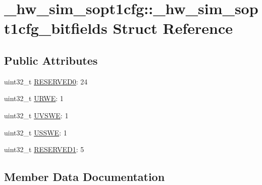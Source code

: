 \hypertarget{struct__hw__sim__sopt1cfg_1_1__hw__sim__sopt1cfg__bitfields}{}\section{\+\_\+hw\+\_\+sim\+\_\+sopt1cfg\+:\+:\+\_\+hw\+\_\+sim\+\_\+sopt1cfg\+\_\+bitfields Struct Reference}
\label{struct__hw__sim__sopt1cfg_1_1__hw__sim__sopt1cfg__bitfields}
\subsection*{Public Attributes}
\begin{DoxyCompactItemize}
\item 
uint32\+\_\+t \hyperlink{struct__hw__sim__sopt1cfg_1_1__hw__sim__sopt1cfg__bitfields_a7fa37a3c3d473222b979f8968fac1c8e}{R\+E\+S\+E\+R\+V\+E\+D0}\+: 24
\item 
uint32\+\_\+t \hyperlink{struct__hw__sim__sopt1cfg_1_1__hw__sim__sopt1cfg__bitfields_a08b38931caa98e2036bba49cdbcb4f19}{U\+R\+WE}\+: 1
\item 
uint32\+\_\+t \hyperlink{struct__hw__sim__sopt1cfg_1_1__hw__sim__sopt1cfg__bitfields_a62e6be5c680df145223c22583bc726d6}{U\+V\+S\+WE}\+: 1
\item 
uint32\+\_\+t \hyperlink{struct__hw__sim__sopt1cfg_1_1__hw__sim__sopt1cfg__bitfields_a3dfa779b90dc15433e33c9c4eec39584}{U\+S\+S\+WE}\+: 1
\item 
uint32\+\_\+t \hyperlink{struct__hw__sim__sopt1cfg_1_1__hw__sim__sopt1cfg__bitfields_a5e02c684459cef405d4be0e1ad1829f2}{R\+E\+S\+E\+R\+V\+E\+D1}\+: 5
\end{DoxyCompactItemize}


\subsection{Member Data Documentation}
